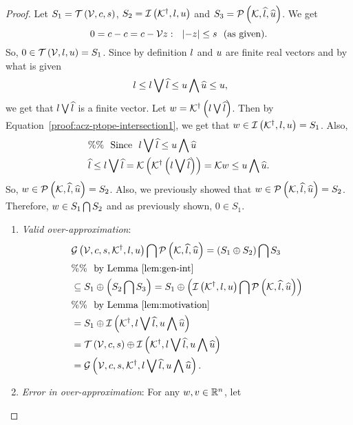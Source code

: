 \begin{proof}
Let $S_1=\mathit{\operatorname{\mathcal{T}}}\left(\mathcal{V},c,s\right)$,
$S_2=\mathit{\operatorname{\mathcal{I}}}\left({\mathcal{K}}^\dagger,l,u\right)$ and
$S_3=\mathcal{P}\left(\mathcal{K},\widehat{l},\widehat{u}\right)$.  We get
%
\[
0=c-c=c-\mathcal{V} z:~~\left|-z\right|\leq s~~\text{(as given)}.
\]
%
So, $0\in \mathit{\operatorname{\mathcal{T}}}\left(\mathcal{V},l,u\right)=S_1$.  Since by definition $l$ and $u$ are finite real
vectors and by what is given
%
\begin{equation}~\label{proof:acz-ptope-intersection1}
  l\leq l\bigvee \widehat{l}\leq u\bigwedge \widehat{u}\leq u,
\end{equation}
%
 we get that $l\bigvee \widehat{l}$ is a finite vector.  Let
 $w={\mathcal{K}}^\dagger\left(l\bigvee \widehat{l}\right)$.  Then by Equation~\ref{proof:acz-ptope-intersection1},
 we get that $w\in\mathit{\operatorname{\mathcal{I}}}\left({\mathcal{K}}^\dagger,l,u\right)=S_1$.  Also,
%
 \begin{align*}
   &\%\%~~\text{Since}~~l\bigvee \widehat{l}\leq u\bigwedge \widehat{u}\\
& \widehat{l}\leq l\bigvee \widehat{l}=\mathcal{K}\left({\mathcal{K}}^\dagger\left(l\bigvee \widehat{l}\right)\right)=\mathcal{K}
w
\leq u\bigwedge \widehat{u}.
\end{align*}
%
So, $w\in\mathcal{P}\left(\mathcal{K},\widehat{l},\widehat{u}\right)=S_2$.  Also, we previously showed
that $w\in\mathcal{P}\left(\mathcal{K},\widehat{l},\widehat{u}\right)=S_2$.  Therefore, $w\in
S_1\bigcap S_2$ and as previously shown, $0\in S_1$.
\begin{enumerate}
\item {\it Valid over-approximation}:
%
\begin{align*}
  & \mathcal{G}\left(\mathcal{V},c,s,{\mathcal{K}}^\dagger,l,u\right)\bigcap \mathcal{P}\left(\mathcal{K},\widehat{l},\widehat{u}\right)=
  \left(S_1\oplus S_2\right)\bigcap S_3\\
  &\%\%~~ \text{by Lemma~\ref{lem:gen-int}}\\
  & \subseteq S_1\oplus \left(S_2\bigcap S_3\right)=
  S_1\oplus \left(\mathit{\operatorname{\mathcal{I}}}\left({\mathcal{K}}^\dagger,l,u\right)\bigcap \mathcal{P}\left(\mathcal{K},\widehat{l},\widehat{u}\right)\right)\\
  & \%\%~~\text{by Lemma~\ref{lem:motivation}}\\
  &
  = S_1\oplus \mathit{\operatorname{\mathcal{I}}}\left({\mathcal{K}}^\dagger,l\bigvee \widehat{l},u\bigwedge \widehat{u}\right)\\
  & =
  \mathit{\operatorname{\mathcal{T}}}\left(\mathcal{V},c,s\right)\oplus \mathit{\operatorname{\mathcal{I}}}\left({\mathcal{K}}^\dagger,l\bigvee \widehat{l},u\bigwedge \widehat{u}\right)\\
  & = \mathcal{G}\left(\mathcal{V},c,s,{\mathcal{K}}^\dagger,l\bigvee \widehat{l},u\bigwedge \widehat{u}\right).
\end{align*}
\item {\it Error in over-approximation}: For any $w,v\in\mathbb{R}^n$, let

\end{enumerate}
\end{proof}

